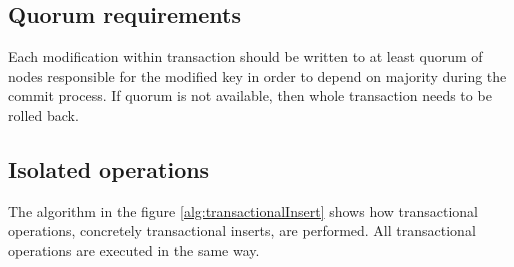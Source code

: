 \subsection{Quorum requirements}
Each modification within transaction should be written to at least quorum of nodes responsible for the modified key in order to depend on majority during the commit process. If quorum is not available, then whole transaction needs to be rolled back. 

\subsection{Isolated operations}
The algorithm in the figure \ref{alg:transactionalInsert} shows how transactional operations, concretely transactional inserts, are performed. All transactional operations are executed in the same way. 

    


